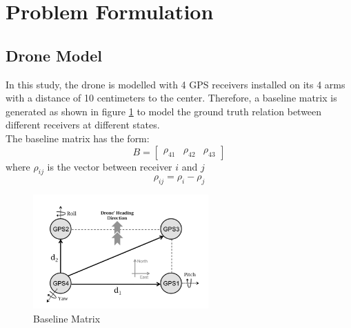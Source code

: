 \documentclass[journal,onecolumn]{IEEEtran}
\begin{document}
\section{Problem Formulation}
\subsection{Drone Model}
In this study, the drone is modelled with 4 GPS receivers installed on its 4 arms
with a distance of 10 centimeters to the center.
Therefore, a baseline matrix is generated as shown in figure \ref{drone} to
model the ground truth relation between different receivers at different states.\\
The baseline matrix has the form:
\begin{equation}
  B = \begin{bmatrix}\rho_{41}& \rho_{42}& \rho_{43}\end{bmatrix}
\end{equation}
where $\rho_{ij}$ is the vector between receiver $i$ and $j$
\begin{equation}
  \rho_{ij} = \rho_{i} - \rho_{j}
\end{equation}
\begin{figure}
  \centering
  \captionsetup{justification=centering}
  \includegraphics[width=0.6\textwidth]{fig/drone.png}
  \caption{Baseline Matrix}
  \label{drone}
\end{figure}
\end{document}
